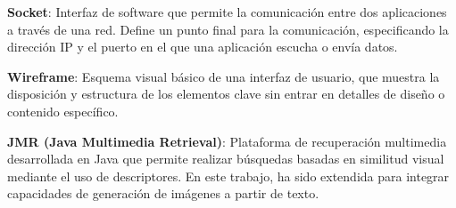 \textbf{Socket}: Interfaz de software que permite la comunicación entre dos aplicaciones a través de una red. Define un punto final para la comunicación, especificando la dirección IP y el puerto en el que una aplicación escucha o envía datos.

\vspace{5mm}

\textbf{Wireframe}: Esquema visual básico de una interfaz de usuario, que muestra la disposición y estructura de los elementos clave sin entrar en detalles de diseño o contenido específico.

\vspace{5mm}

\textbf{JMR (Java Multimedia Retrieval)}: Plataforma de recuperación multimedia desarrollada en Java que permite realizar búsquedas basadas en similitud visual mediante el uso de descriptores. En este trabajo, ha sido extendida para integrar capacidades de generación de imágenes a partir de texto.

\vspace{5mm}
